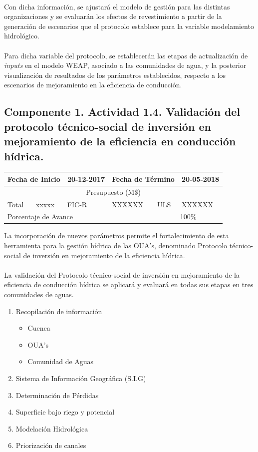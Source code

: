 \documentclass[]{article}
\begin{document}
\\
Con dicha información, se ajustará el modelo de gestión para las distintas organizaciones y se evaluarán los efectos de revestimiento a partir de la generación de escenarios que el protocolo establece para la variable modelamiento hidrológico.\\
\\
Para dicha variable del protocolo, se establecerán las etapas de actualización de \textit{inputs} en el modelo WEAP, asociado a las comunidades de agua, y la posterior visualización de resultados de los parámetros establecidos, respecto a los escenarios de mejoramiento en la eficiencia de conducción.

\subsection{Componente 1. Actividad 1.4. Validación del protocolo técnico-social de inversión en mejoramiento de la eficiencia en conducción hídrica.}

\begin{table}[!htb]
\centering
\begin{tabular}{|p{2cm}|p{2cm}|p{2cm}|p{2cm}|p{2cm}|p{2cm}|}
    \hline
    \multicolumn{2}{|l|}{Fecha de Inicio} & 20-12-2017 & \multicolumn{2}{l|}{Fecha de Término} & 20-05-2018\\
    \hline
    \multicolumn{6}{|c|}{Presupuesto (M\$)}\\
    \hline
    Total & xxxxx & FIC-R & XXXXXX & ULS & XXXXXX\\
    \hline
    \multicolumn{4}{|l|}{Porcentaje de Avance} & \multicolumn{2}{c|}{100\%}\\
    \hline
\end{tabular}
\end{table}

La incorporación de nuevos parámetros permite el fortalecimiento de esta herramienta para la gestión hídrica de las OUA's, denominado Protocolo técnico-social de inversión en mejoramiento de la eficiencia hídrica.\\
\\
La validación del Protocolo técnico-social de inversión en mejoramiento de la eficiencia de conducción hídrica se aplicará y evaluará en todas sus etapas en tres comunidades de aguas.

\begin{enumerate}
\item Recopilación de información
\begin{itemize}	
	\item Cuenca
	\item OUA's
	\item Comunidad de Aguas
\end{itemize}
\item Sistema de Información Geográfica (S.I.G)
\item Determinación de Pérdidas
\item Superficie bajo riego y potencial
\item Modelación Hidrológica
\item Priorización de canales
\end{enumerate}
\clearpage
\end{document}
